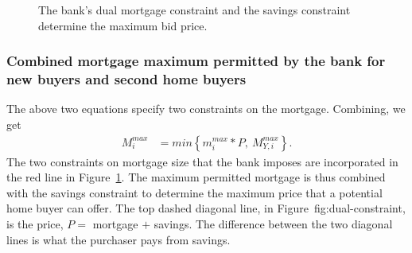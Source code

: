 {  \begin{figure}
    \centering
    
    \caption{The bank's dual mortgage constraint and the savings constraint determine the maximum bid price.}
    \label{fig:dual-constraint}
    \end{figure}

\subsubsection{Combined mortgage maximum permitted by the bank for new buyers and second home buyers}

The above two equations specify two constraints on the mortgage.  Combining, we get 
\begin{align} 
M_i^{max} &= min \left\{ m_i^{max}*P, \ M^{max}_{Y,i} \right\}. 
\label{eqn-max-mortgage-combined}
\end{align}
The two constraints on mortgage size that the bank imposes are incorporated in the red line in Figure~\ref{fig:dual-constraint}. The maximum permitted mortgage is thus combined with the savings constraint to determine the maximum price that a potential home buyer can offer. The top dashed diagonal line, in Figure~{fig:dual-constraint}, is the price, $P =$ mortgage $+$ savings. The difference between the two diagonal lines is what the purchaser pays from savings. %

}
